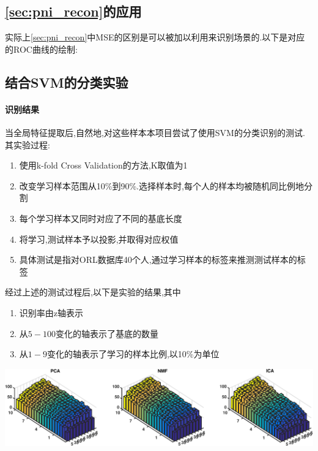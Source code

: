 \subsection{\ref{sec:pni_recon}的应用}
实际上\ref{sec:pni_recon}中MSE的区别是可以被加以利用来识别场景的.以下是对应的ROC曲线的绘制:

\subsection{结合SVM的分类实验}
\paragraph{识别结果} 当全局特征提取后,自然地,对这些样本本项目尝试了使用SVM的分类识别的测试.其实验过程:
	\begin{enumerate}
		\item 使用k-fold Cross Validation的方法,K取值为1
		\item 改变学习样本范围从10\%到90\%.选择样本时,每个人的样本均被随机同比例地分割
		\item 每个学习样本又同时对应了不同的基底长度
		\item 将学习,测试样本予以投影,并取得对应权值
		\item 具体测试是指对ORL数据库40个人,通过学习样本的标签来推测测试样本的标签
	\end{enumerate}
	经过上述的测试过程后,以下是实验的结果,其中
	\begin{enumerate}
		\item 识别率由z轴表示
		\item 从$5-100$变化的轴表示了基底的数量
		\item 从$1-9$变化的轴表示了学习的样本比例,以10\%为单位
	\end{enumerate}
	
	\begin{center}
	\begin{minipage}[t]{\linewidth}
	\center
	{
	\includegraphics[width=\textwidth]{Img/svm_pni} 
	}
	\end{minipage}
	\medskip
	\end{center}


